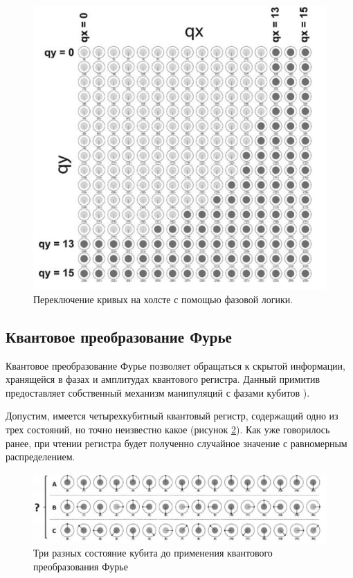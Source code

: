 \begin{figure}[h]
	\begin{center}
		\includegraphics[scale=0.57]{img/holst_03.png}
	\end{center}
	\captionsetup{justification=centering}
	\caption{Переключение кривых на холсте с помощью фазовой логики.}
	\label{for:holst_03}
\end{figure}

\subsection{Квантовое преобразование Фурье}\label{furie}

Квантовое преобразование Фурье позволяет обращаться к скрытой информации, хранящейся в фазах и амплитудах квантового регистра. Данный примитив предоставляет собственный механизм манипуляций с фазами кубитов \cite{PQC-furie}).

Допустим, имеется четырехкубитный квантовый регистр, содержащий одно из трех состояний, но точно неизвестно какое (рисунок \ref{img:furie-example-01}). Как уже говорилось ранее, при чтении регистра будет полученно случайное значение с равномерным распределением. 

\begin{figure}[h]
	\begin{center}
		\includegraphics[scale=0.4]{img/furie-example.png}
	\end{center}
	\captionsetup{justification=centering}
	\caption{Три разных состояние кубита до применения квантового преобразования Фурье}
	\label{img:furie-example-01}
\end{figure}

